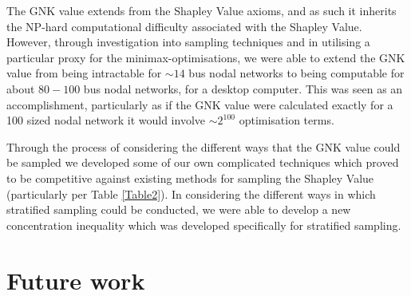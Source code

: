 
The GNK value extends from the Shapley Value axioms, and as such it inherits the NP-hard computational difficulty associated with the Shapley Value.
However, through investigation into sampling techniques and in utilising a particular proxy for the minimax-optimisations, we were able to extend the GNK value from being intractable for $\sim 14$ bus nodal networks to being computable for about $80-100$ bus nodal networks, for a desktop computer.
This was seen as an accomplishment, particularly as if the GNK value were calculated exactly for a 100 sized nodal network it would involve $\sim 2^{100}$ optimisation terms.

Through the process of considering the different ways that the GNK value could be sampled we developed some of our own complicated techniques which proved to be competitive against existing methods for sampling the Shapley Value (particularly per Table \ref{Table2}).
In considering the different ways in which stratified sampling could be conducted, we were able to develop a new concentration inequality which was developed specifically for stratified sampling.




\section{Future work}
\label{sec:future}


